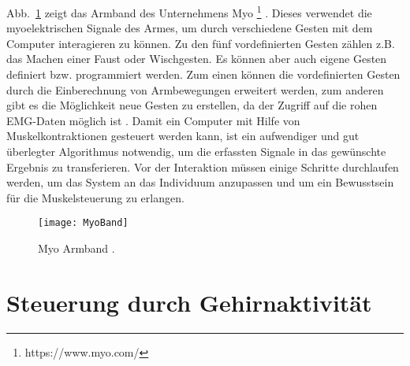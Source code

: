 \newline \newline
Abb.~\ref{fig:MyoBand} zeigt das Armband des Unternehmens Myo%
\footnote{https://www.myo.com/}
%
. Dieses verwendet die myoelektrischen Signale des Armes, um durch verschiedene Gesten mit dem Computer interagieren zu können. Zu den fünf vordefinierten Gesten zählen z.B. das Machen einer Faust oder Wischgesten. Es können aber auch eigene Gesten definiert bzw. programmiert werden. Zum einen können die vordefinierten Gesten durch die Einberechnung von Armbewegungen erweitert werden, zum anderen gibt es die Möglichkeit neue Gesten zu erstellen, da der Zugriff auf die rohen EMG-Daten möglich ist \cite{myoBand2}.%
\newline \newline \newline 
Damit ein Computer mit Hilfe von Muskelkontraktionen gesteuert werden kann, ist ein aufwendiger und gut überlegter Algorithmus notwendig, um die erfassten Signale in das gewünschte Ergebnis zu transferieren. Vor der Interaktion müssen einige Schritte durchlaufen werden, um das System an das Individuum anzupassen und um ein Bewusstsein für die Muskelsteuerung zu erlangen.
%
%
\begin{figure}
\centering
\texttt{[image: MyoBand]}
\caption{Myo Armband \cite{myoBand}.}
\label{fig:MyoBand}
\end{figure}
%
%

\section{Steuerung durch Gehirnaktivität}

